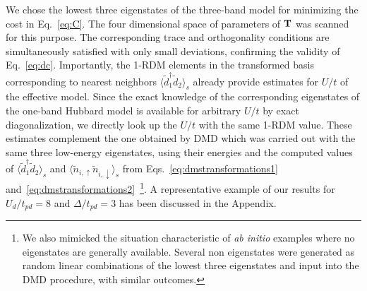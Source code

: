 We chose the lowest three eigenstates of the three-band model for minimizing 
the cost in Eq.~\eqref{eq:C}. The four dimensional space of parameters of ${\bf T}$ 
was scanned for this purpose. The corresponding trace and orthogonality conditions are simultaneously 
satisfied with only small deviations, confirming the validity of Eq.~\eqref{eq:dc}. 
Importantly, the 1-RDM elements in the transformed basis corresponding to nearest neighbors $\langle \tilde{d}_1^{\dagger} \tilde{d}_2 \rangle_s$ 
already provide estimates for $U/t$ of the effective model. Since the exact knowledge of the corresponding eigenstates of 
the one-band Hubbard model is available for arbitrary $U/t$ by exact diagonalization, we directly look up the $U/t$ with 
the same 1-RDM value. These estimates complement the one obtained by DMD which was carried out 
with the same three low-energy eigenstates, using their energies and 
the computed values of $\langle \tilde{d}_1^{\dagger} \tilde{d}_2 \rangle_s$ 
and $\langle \tilde{n}_{i,\uparrow} \tilde{n}_{i,\downarrow} \rangle_{s}$ from Eqs.~\eqref{eq:dmstransformations1} 
and~\eqref{eq:dmstransformations2}~\footnote{We also mimicked the situation characteristic of \textit{ab initio} 
examples where no eigenstates are generally available. Several non eigenstates were generated as random linear combinations of 
the lowest three eigenstates and input into the DMD procedure, with 
similar outcomes.}. A representative example of our results for $U_{d}/t_{pd}=8$ and $\Delta/t_{pd}=3$ 
has been discussed in the Appendix. 

